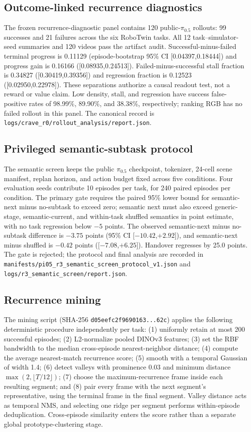 \subsection{Outcome-linked recurrence diagnostics}
The frozen recurrence-diagnostic panel contains 120 public-$\pi_{0.5}$
rollouts: 99 successes and 21 failures across the six RoboTwin tasks.  All 12
task--simulator-seed summaries and 120 videos pass the artifact audit.
Successful-minus-failed terminal progress is 0.11129 (episode-bootstrap 95\%
CI [0.04397,0.18444]) and progress gain is 0.16166
([0.08935,0.24513]).  Failed-minus-successful stall fraction is 0.34827
([0.30419,0.39356]) and regression fraction is 0.12523
([0.02950,0.22978]).  These separations authorize a causal readout test, not a
reward or value claim.  Low density, stall, and regression have success
false-positive rates of 98.99\%, 89.90\%, and 38.38\%, respectively; ranking
RGB has no failed rollout in this panel.  The canonical record is
\texttt{logs/crave\_r0/rollout\_analysis/report.json}.

\subsection{Privileged semantic-subtask protocol}
The semantic screen keeps the public $\pi_{0.5}$ checkpoint, tokenizer,
24-cell scene manifest, replan horizon, and action budget fixed across five
conditions.  Four evaluation seeds contribute 10 episodes per task, for 240
paired episodes per condition.  The primary gate requires the paired 95\%
lower bound for semantic-next minus no-subtask to exceed zero; semantic next
must also exceed generic-stage, semantic-current, and within-task shuffled
semantics in point estimate, with no task regression below $-5$ points.  The
observed semantic-next minus no-subtask difference is $-3.75$ points (95\% CI
[$-10.42$,$+2.92$]), and semantic-next minus shuffled is $-0.42$ points
([$-7.08$,$+6.25$]).  Handover regresses by 25.0 points.  The gate is rejected;
the protocol and final analysis are recorded in
\texttt{manifests/pi05\_r3\_semantic\_screen\_protocol\_v1.json} and
\texttt{logs/r3\_semantic\_screen/report.json}.

\subsection{Recurrence mining}
The mining script (SHA-256 \texttt{d05eefc2f9690163...62c}) applies the following
deterministic procedure independently per task: (1) uniformly retain at most
200 successful episodes; (2) L2-normalize pooled DINOv3 features; (3) set the
RBF bandwidth to the median cross-episode nearest-neighbor distance; (4)
compute the average nearest-match recurrence score; (5) smooth with a temporal
Gaussian of width 1.4; (6) detect valleys with prominence 0.03 and minimum
distance $\max(2,\lfloor T/12\rfloor)$; (7) choose the maximum-recurrence frame
inside each resulting segment; and (8) pair every frame with the next segment's
representative, using the terminal frame in the final segment.  Valley distance
acts as temporal NMS, and selecting one ridge per segment performs within-episode
deduplication.  Cross-episode similarity enters the score rather than a separate
global prototype-clustering stage.


